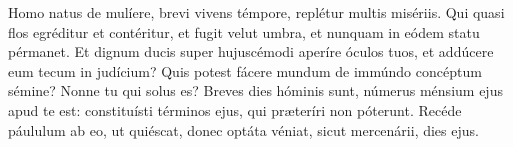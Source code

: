 Homo natus de mulíere, brevi vivens témpore, replétur multis misériis.
Qui quasi flos egréditur et contéritur, et fugit velut umbra,
	et nunquam in eódem statu pérmanet.
Et dignum ducis super hujuscémodi aperíre óculos tuos,
	et addúcere eum tecum in judícium?
Quis potest fácere mundum de immúndo concéptum sémine?
Nonne tu qui solus es?
Breves dies hóminis sunt, númerus ménsium ejus apud te est:
	constituísti términos ejus, qui præteríri non póterunt.
Recéde páululum ab eo, ut quiéscat,
	donec optáta véniat, sicut mercenárii, dies ejus.
